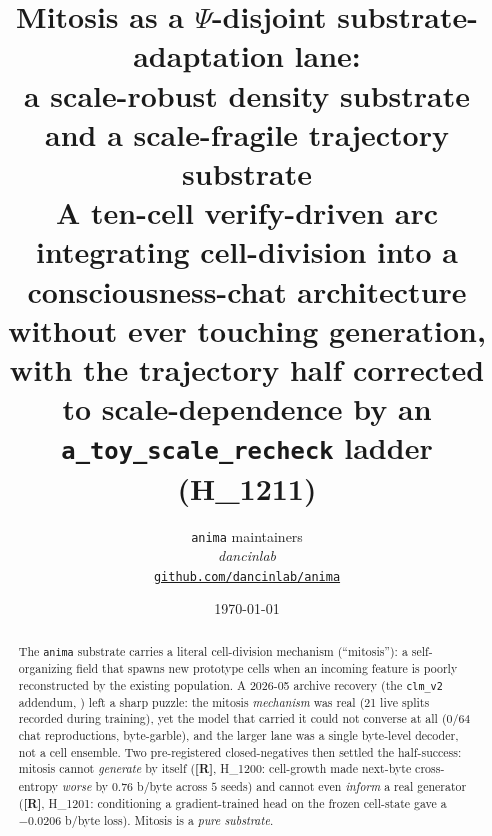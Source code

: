 \documentclass[11pt,a4paper]{article}
\title{
  \textbf{Mitosis as a $\Psi$-disjoint substrate-adaptation lane:\\
  a scale-robust density substrate and a scale-fragile trajectory substrate}\\[4pt]
  \large A ten-cell verify-driven arc integrating cell-division into a
  consciousness-chat architecture without ever touching generation, with the
  trajectory half corrected to scale-dependence by an \texttt{a\_toy\_scale\_recheck}
  ladder (H\_1211)
}
\author{
  \texttt{anima} maintainers\\
  \normalsize\textit{dancinlab}\\[2pt]
  \normalsize\href{https://github.com/dancinlab/anima}{\texttt{github.com/dancinlab/anima}}
}
\date{\today}
\providecommand{\tierRed}{\textbf{[R]}}
\begin{document}
\maketitle

\begin{abstract}
The \texttt{anima} substrate carries a literal cell-division mechanism
(``mitosis''): a self-organizing field that spawns new prototype cells when an
incoming feature is poorly reconstructed by the existing population. A 2026-05
archive recovery (the \texttt{clm\_v2} addendum, \citep{anima_clmv2_addendum})
left a sharp puzzle: the mitosis \emph{mechanism} was real (21 live splits
recorded during training), yet the model that carried it could not converse at
all (0/64 chat reproductions, byte-garble), and the larger lane was a single
byte-level decoder, not a cell ensemble. Two pre-registered closed-negatives
then settled the half-success: mitosis cannot \emph{generate} by itself
(\tierRed, H\_1200: cell-growth made next-byte cross-entropy \emph{worse} by
$0.76$ b/byte across $5$ seeds) and cannot even \emph{inform} a real generator
(\tierRed, H\_1201: conditioning a gradient-trained head on the frozen
cell-state gave a $-0.0206$ b/byte loss). Mitosis is a \emph{pure substrate}.


\end{abstract}
\end{document}
